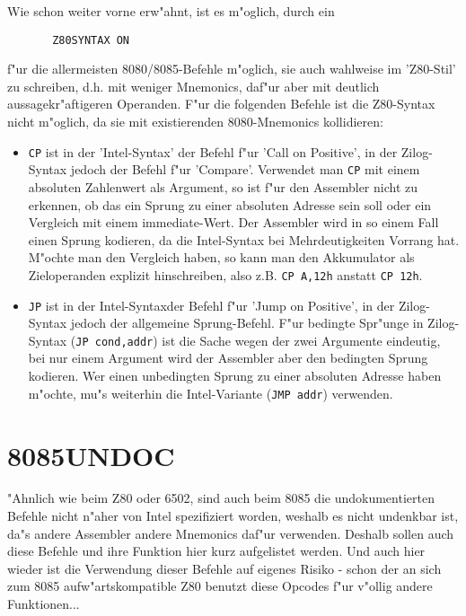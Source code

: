 \documentclass[12pt,a4paper,twoside]{report}
\newcommand{\tty}[1]{{\tt #1}}
\begin{document}
Wie schon weiter vorne erw"ahnt, ist es m"oglich, durch ein
\begin{verbatim}
       Z80SYNTAX ON
\end{verbatim}
f"ur die allermeisten 8080/8085-Befehle m"oglich, sie auch wahlweise
im 'Z80-Stil' zu schreiben, d.h. mit weniger Mnemonics, daf"ur aber
mit deutlich aussagekr"aftigeren Operanden.  F"ur die folgenden
Befehle ist die Z80-Syntax nicht m"oglich, da sie mit existierenden
8080-Mnemonics kollidieren:
\begin{itemize}
\item{\tty{CP} ist in der 'Intel-Syntax' der Befehl f"ur 'Call on
      Positive', in der Zilog-Syntax jedoch der Befehl f"ur
      'Compare'.  Verwendet man \tty{CP} mit einem absoluten
      Zahlenwert als Argument, so ist f"ur den Assembler nicht zu
      erkennen, ob das ein Sprung zu einer absoluten Adresse sein
      soll oder ein Vergleich mit einem immediate-Wert.  Der
      Assembler wird in so einem Fall einen Sprung kodieren, da
      die Intel-Syntax bei Mehrdeutigkeiten Vorrang hat.  M"ochte
      man den Vergleich haben, so kann man den Akkumulator als
      Zieloperanden explizit hinschreiben, also z.B. \tty{CP A,12h}
      anstatt \tty{CP 12h}.}
\item{\tty{JP} ist in der Intel-Syntaxder Befehl f"ur 'Jump on
      Positive', in der Zilog-Syntax jedoch der allgemeine
      Sprung-Befehl.  F"ur bedingte Spr"unge in Zilog-Syntax (\tty{JP
      cond,addr}) ist die Sache wegen der zwei Argumente eindeutig,
      bei nur einem Argument wird der Assembler aber den bedingten
      Sprung kodieren.  Wer einen unbedingten Sprung zu einer
      absoluten Adresse haben m"ochte, mu"s weiterhin die
      Intel-Variante (\tty{JMP addr}) verwenden.}
\end{itemize}


\section{8085UNDOC}
\label{8085Spec}

"Ahnlich wie beim Z80 oder 6502, sind auch beim 8085 die undokumentierten
Befehle nicht n"aher von Intel spezifiziert worden, weshalb es nicht
undenkbar ist, da"s andere Assembler andere Mnemonics daf"ur verwenden.
Deshalb sollen auch diese Befehle und ihre Funktion hier kurz aufgelistet
werden.  Und auch hier wieder ist die Verwendung dieser Befehle auf
eigenes Risiko - schon der an sich zum 8085 aufw"artskompatible Z80
benutzt diese Opcodes f"ur v"ollig andere Funktionen...
\end{document}
